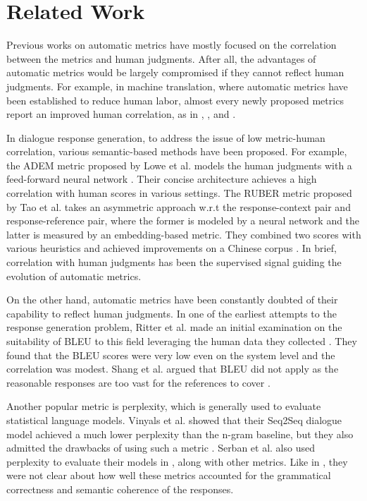 \documentclass[runningheads]{llncs}
\begin{document}
    \section{Related Work}
    Previous works on automatic metrics have mostly focused on the correlation between the metrics and human judgments. After all, the advantages of automatic metrics would be largely compromised if they cannot reflect human judgments. For example, in machine translation, where automatic metrics have been established to reduce human labor, almost every newly proposed metrics report an improved human correlation, as in \cite{NIST}, \cite{METEOR}, and \cite{chrf}.

    In dialogue response generation, to address the issue of low metric-human correlation, various semantic-based methods have been proposed. For example, the ADEM metric proposed by Lowe et al. models the human judgments with a feed-forward neural network \cite{ADEM}. Their concise architecture achieves a high correlation with human scores in various settings. The RUBER metric proposed by Tao et al. takes an asymmetric approach w.r.t the response-context pair and response-reference pair, where the former is modeled by a neural network and the latter is measured by an embedding-based metric. They combined two scores with various heuristics and achieved improvements on a Chinese corpus \cite{RUBER}. In brief, correlation with human judgments has been the supervised signal guiding the evolution of automatic metrics.

    On the other hand, automatic metrics have been constantly doubted of their capability to reflect human judgments. In one of the earliest attempts to the response generation problem, Ritter et al. made an initial examination on the suitability of BLEU to this field leveraging the human data they collected \cite{Ritter11}. They found that the BLEU scores were very low even on the system level and the correlation was modest. Shang et al. argued that BLEU did not apply as the reasonable responses are too vast for the references to cover \cite{Shang}.

    Another popular metric is perplexity, which is generally used to evaluate statistical language models. Vinyals et al. showed that their Seq2Seq dialogue model achieved a much lower perplexity than the n-gram baseline, but they also admitted the drawbacks of using such a metric \cite{GoogleChatbot}. Serban et al. also used perplexity to evaluate their models in \cite{HRED}, along with other metrics. Like in \cite{GoogleChatbot}, they were not clear about how well these metrics accounted for the grammatical correctness and semantic coherence of the responses.
\end{document}
